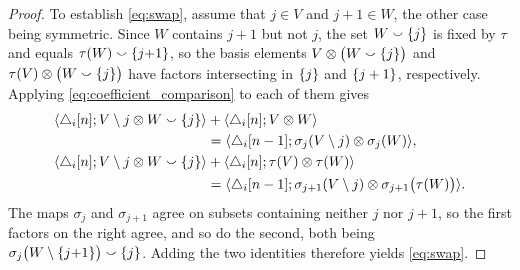 \begin{proof}
	To establish \cref{eq:swap}, assume that $j \in V$ and $j+1 \in W$, the other case being symmetric.
	Since $W$ contains $j+1$ but not $j$, the set $W \union \set{j}$ is fixed by $\tau$ and equals $\tau(W) \union \set{j{+}1}$, so the basis elements $V \ot \big(W \union \set{j}\big)$ and $\tau(V) \ot \big(W \union \set{j}\big)$ have factors intersecting in $\{j\}$ and $\{j+1\}$, respectively.
	Applying \cref{eq:coefficient_comparison} to each of them gives
	\begin{align*}
		\coeff{\triangle_i[n]}{V \setminus j \ot W \union \set{j}} &+ \coeff{\triangle_i[n]}{V \ot W} \\ &=
		\coeff{\triangle_i[n-1]}{\sigma_j(V \setminus j) \ot \sigma_j(W)}, \\
		\coeff{\triangle_i[n]}{V \setminus j \ot W \union \set{j}} &+ \coeff{\triangle_i[n]}{\tau(V) \ot \tau(W)} \\ &=
		\coeff{\triangle_i[n-1]}{\sigma_{j+1}(V \setminus j) \ot \sigma_{j+1}\big(\tau(W)\big)}.
	\end{align*}
	The maps $\sigma_j$ and $\sigma_{j+1}$ agree on subsets containing neither $j$ nor $j+1$, so the first factors on the right agree, and so do the second, both being $\sigma_j\big(W \setminus \set{j{+}1}\big) \union \set{j}$.
	Adding the two identities therefore yields \cref{eq:swap}.
\end{proof}
